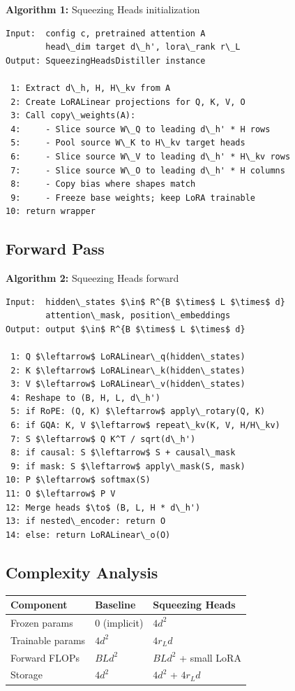\textbf{Algorithm 1:} Squeezing Heads initialization
\begin{lstlisting}
Input:  config c, pretrained attention A
        head\_dim target d\_h', lora\_rank r\_L
Output: SqueezingHeadsDistiller instance

 1: Extract d\_h, H, H\_kv from A
 2: Create LoRALinear projections for Q, K, V, O
 3: Call copy\_weights(A):
 4:     - Slice source W\_Q to leading d\_h' * H rows
 5:     - Pool source W\_K to H\_kv target heads
 6:     - Slice source W\_V to leading d\_h' * H\_kv rows
 7:     - Slice source W\_O to leading d\_h' * H columns
 8:     - Copy bias where shapes match
 9:     - Freeze base weights; keep LoRA trainable
10: return wrapper
\end{lstlisting}

\subsection{Forward Pass}

\textbf{Algorithm 2:} Squeezing Heads forward
\begin{lstlisting}
Input:  hidden\_states $\in$ R^{B $\times$ L $\times$ d}
        attention\_mask, position\_embeddings
Output: output $\in$ R^{B $\times$ L $\times$ d}

 1: Q $\leftarrow$ LoRALinear\_q(hidden\_states)
 2: K $\leftarrow$ LoRALinear\_k(hidden\_states)
 3: V $\leftarrow$ LoRALinear\_v(hidden\_states)
 4: Reshape to (B, H, L, d\_h')
 5: if RoPE: (Q, K) $\leftarrow$ apply\_rotary(Q, K)
 6: if GQA: K, V $\leftarrow$ repeat\_kv(K, V, H/H\_kv)
 7: S $\leftarrow$ Q K^T / sqrt(d\_h')
 8: if causal: S $\leftarrow$ S + causal\_mask
 9: if mask: S $\leftarrow$ apply\_mask(S, mask)
10: P $\leftarrow$ softmax(S)
11: O $\leftarrow$ P V
12: Merge heads $\to$ (B, L, H * d\_h')
13: if nested\_encoder: return O
14: else: return LoRALinear\_o(O)
\end{lstlisting}

\subsection{Complexity Analysis}

\begin{table}[H]
\centering
\small
\begin{tabular}{lll}
\toprule
\textbf{Component} & \textbf{Baseline} & \textbf{Squeezing Heads} \\
\midrule
Frozen params & 0 (implicit) & $4 d^2$ \\
Trainable params & $4 d^2$ & $4 r_L d$ \\
Forward FLOPs & $B L d^2$ & $B L d^2$ + small LoRA \\
Storage & $4 d^2$ & $4 d^2$ + $4 r_L d$ \\
\bottomrule
\end{tabular}
\end{table}

